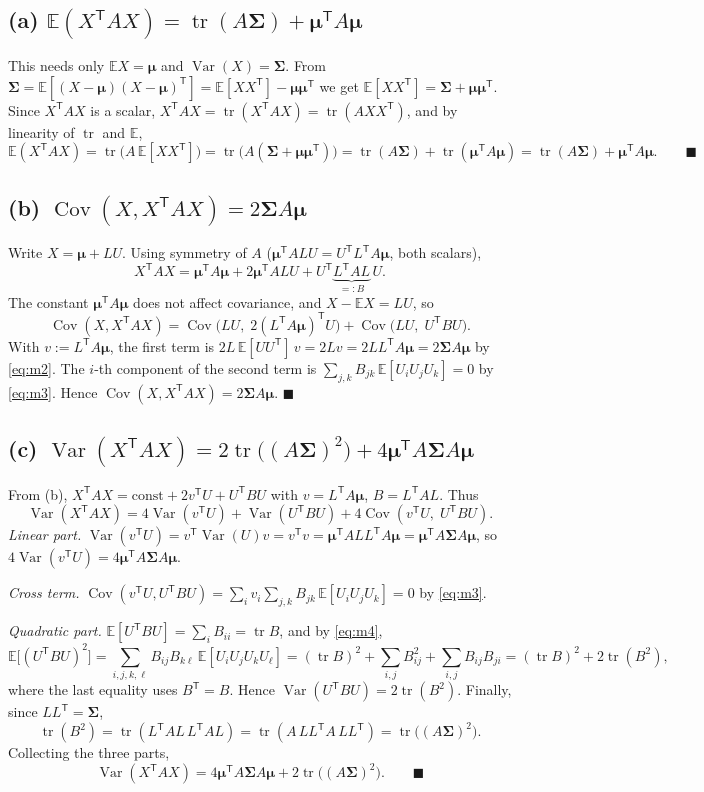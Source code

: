 \documentclass[11pt]{article}
\DeclareMathOperator{\tr}{tr}
\DeclareMathOperator{\Var}{Var}
\DeclareMathOperator{\Cov}{Cov}
\newcommand{\E}{\mathbb{E}}
\newcommand{\bmu}{\bm{\mu}}
\newcommand{\bSig}{\bm{\Sigma}}
\newcommand{\T}{^{\mathsf{T}}}
\theoremstyle{remark}
\begin{document}
\subsection*{(a) $\E(X\T AX)=\tr(A\bSig)+\bmu\T A\bmu$}

This needs only $\E X=\bmu$ and $\Var(X)=\bSig$. From
$\bSig=\E[(X-\bmu)(X-\bmu)\T]=\E[XX\T]-\bmu\bmu\T$ we get $\E[XX\T]=\bSig+\bmu\bmu\T$. Since $X\T AX$ is a
scalar, $X\T AX=\tr(X\T AX)=\tr(AXX\T)$, and by linearity of $\tr$ and $\E$,
\[
\E(X\T AX)=\tr\!\big(A\,\E[XX\T]\big)=\tr\!\big(A(\bSig+\bmu\bmu\T)\big)
=\tr(A\bSig)+\tr(\bmu\T A\bmu)=\tr(A\bSig)+\bmu\T A\bmu. \qquad\blacksquare
\]

\subsection*{(b) $\Cov(X,X\T AX)=2\bSig A\bmu$}

Write $X=\bmu+LU$. Using symmetry of $A$ ($\bmu\T A L U=U\T L\T A\bmu$, both scalars),
\[
X\T AX=\bmu\T A\bmu+2\bmu\T ALU+U\T\!\underbrace{L\T AL}_{=:B}\,U .
\]
The constant $\bmu\T A\bmu$ does not affect covariance, and $X-\E X=LU$, so
\[
\Cov(X,X\T AX)=\Cov\!\big(LU,\;2(L\T A\bmu)\T U\big)+\Cov\!\big(LU,\;U\T BU\big).
\]
With $v:=L\T A\bmu$, the first term is $2L\,\E[UU\T]\,v=2Lv=2LL\T A\bmu=2\bSig A\bmu$ by \eqref{eq:m2}.
The $i$-th component of the second term is
$\sum_{j,k}B_{jk}\,\E[U_iU_jU_k]=0$ by \eqref{eq:m3}. Hence
$\Cov(X,X\T AX)=2\bSig A\bmu.$ \hfill$\blacksquare$

\subsection*{(c) $\Var(X\T AX)=2\tr\!\big((A\bSig)^2\big)+4\bmu\T A\bSig A\bmu$}

From (b), $X\T AX=\text{const}+2v\T U+U\T BU$ with $v=L\T A\bmu$, $B=L\T AL$. Thus
\[
\Var(X\T AX)=4\Var(v\T U)+\Var(U\T BU)+4\Cov(v\T U,\;U\T BU).
\]
\emph{Linear part.} $\Var(v\T U)=v\T\Var(U)v=v\T v=\bmu\T A LL\T A\bmu=\bmu\T A\bSig A\bmu$, so
$4\Var(v\T U)=4\bmu\T A\bSig A\bmu$.

\emph{Cross term.} $\Cov(v\T U,U\T BU)=\sum_i v_i\sum_{j,k}B_{jk}\,\E[U_iU_jU_k]=0$ by \eqref{eq:m3}.

\emph{Quadratic part.} $\E[U\T BU]=\sum_i B_{ii}=\tr B$, and by \eqref{eq:m4},
\[
\E\big[(U\T BU)^2\big]=\sum_{i,j,k,\ell}B_{ij}B_{k\ell}\,\E[U_iU_jU_kU_\ell]
=(\tr B)^2+\sum_{i,j}B_{ij}^2+\sum_{i,j}B_{ij}B_{ji}
=(\tr B)^2+2\tr(B^2),
\]
where the last equality uses $B\T=B$. Hence $\Var(U\T BU)=2\tr(B^2)$. Finally, since $LL\T=\bSig$,
\[
\tr(B^2)=\tr(L\T AL\,L\T AL)=\tr(A\,LL\T\!A\,LL\T)=\tr\!\big((A\bSig)^2\big).
\]
Collecting the three parts,
\[
\Var(X\T AX)=4\bmu\T A\bSig A\bmu+2\tr\!\big((A\bSig)^2\big). \qquad\blacksquare
\]
\end{document}

